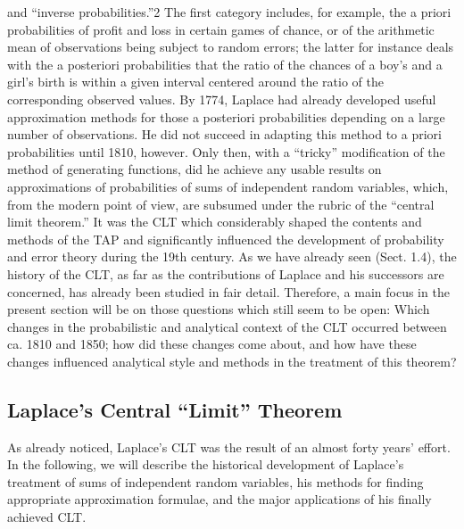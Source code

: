 \documentclass{article}
\begin{document}
and “inverse probabilities.”2 The first category includes, for example, the a priori
probabilities of profit and loss in certain games of chance, or of the arithmetic mean
of observations being subject to random errors; the latter for instance deals with the
a posteriori probabilities that the ratio of the chances of a boy’s and a girl’s birth
is within a given interval centered around the ratio of the corresponding observed
values. By 1774, Laplace had already developed useful approximation methods for
those a posteriori probabilities depending on a large number of observations. He did
not succeed in adapting this method to a priori probabilities until 1810, however.
Only then, with a “tricky” modification of the method of generating functions, did
he achieve any usable results on approximations of probabilities of sums of independent random variables, which, from the modern point of view, are subsumed under
the rubric of the “central limit theorem.” It was the CLT which considerably shaped
the contents and methods of the TAP and significantly influenced the development
of probability and error theory during the 19th century.
As we have already seen (Sect. 1.4), the history of the CLT, as far as the contributions of Laplace and his successors are concerned, has already been studied in
fair detail. Therefore, a main focus in the present section will be on those questions
which still seem to be open: Which changes in the probabilistic and analytical context of the CLT occurred between ca. 1810 and 1850; how did these changes come
about, and how have these changes influenced analytical style and methods in the
treatment of this theorem?
\subsection{Laplace’s Central “Limit” Theorem}
As already noticed, Laplace’s CLT was the result of an almost forty years’ effort.
In the following, we will describe the historical development of Laplace’s treatment
of sums of independent random variables, his methods for finding appropriate approximation formulae, and the major applications of his finally achieved CLT.
\end{document}
